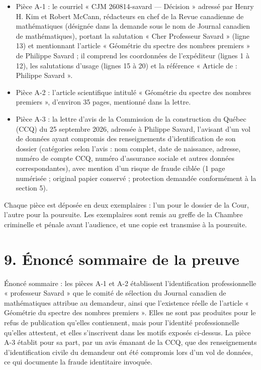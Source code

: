 \documentclass[12pt,a4paper]{article}
\begin{document}
\begin{itemize}
  \item Pièce A-1 : le courriel « CJM 260814-savard — Décision » adressé par Henry H. Kim et Robert McCann, rédacteurs en chef de la Revue canadienne de mathématiques (désignée dans la demande sous le nom de Journal canadien de mathématiques), portant la salutation « Cher Professeur Savard » (ligne 13) et mentionnant l’article « Géométrie du spectre des nombres premiers » de Philippe Savard ; il comprend les coordonnées de l’expéditeur (lignes 1 à 12), les salutations d’usage (lignes 15 à 20) et la référence « Article de : Philippe Savard ».
  \item Pièce A-2 : l’article scientifique intitulé « Géométrie du spectre des nombres premiers », d’environ 35 pages, mentionné dans la lettre.
  \item Pièce A-3 : la lettre d’avis de la Commission de la construction du Québec (CCQ) du 25 septembre 2026, adressée à Philippe Savard, l’avisant d’un vol de données ayant compromis des renseignements d’identification de son dossier (catégories selon l’avis : nom complet, date de naissance, adresse, numéro de compte CCQ, numéro d’assurance sociale et autres données correspondantes), avec mention d’un risque de fraude ciblée (1 page numérisée ; original papier conservé ; protection demandée conformément à la section 5).
\end{itemize}

Chaque pièce est déposée en deux exemplaires : l’un pour le dossier de la Cour, l’autre pour la poursuite. Les exemplaires sont remis au greffe de la Chambre criminelle et pénale avant l’audience, et une copie est transmise à la poursuite.

\section*{9. Énoncé sommaire de la preuve}
Énoncé sommaire : les pièces A-1 et A-2 établissent l’identification professionnelle « professeur Savard » que le comité de sélection du Journal canadien de mathématiques attribue au demandeur, ainsi que l’existence réelle de l’article « Géométrie du spectre des nombres premiers ». Elles ne sont pas produites pour le refus de publication qu’elles contiennent, mais pour l’identité professionnelle qu’elles attestent, et elles s’inscrivent dans les motifs exposés ci-dessus. La pièce A-3 établit pour sa part, par un avis émanant de la CCQ, que des renseignements d’identification civile du demandeur ont été compromis lors d’un vol de données, ce qui documente la fraude identitaire invoquée.
\end{document}
